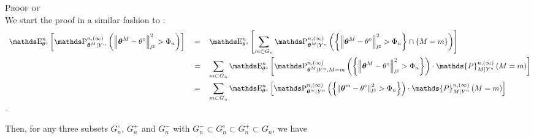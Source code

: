\begin{pro}{\textsc{Proof of } \\}\label{PRO_BAYES_STRATEGIES_EXPOLIM}
We start the proof in a similar fashion to :
\begin{alignat*}{3}
& \E_{\theta^{\circ}}^{n}\left[\P^{n, (\infty)}_{\boldsymbol{\theta}^{M} \vert Y^{n}}\left(\left\Vert  \boldsymbol{\theta}^{M} - \theta^{\circ}\right\Vert_{l^{2}}^{2} > \Phi_{n} \right)\right] && = && \E_{\theta^{\circ}}^{n}\left[\sum\limits_{m \subset G_{n}}\P^{n, (\infty)}_{\boldsymbol{\theta}^{M} \vert Y^{n}}\left(\left\{\left\Vert  \boldsymbol{\theta}^{M} - \theta^{\circ}\right\Vert_{l^{2}}^{2} > \Phi_{n}\right\} \cap \left\{ M = m \right\} \right)\right]\\
& && = && \sum\limits_{m \subset G_{n}}\E_{\theta^{\circ}}^{n}\left[\P^{n, (\infty)}_{\boldsymbol{\theta}^{M} \vert Y^{n}, M = m}\left(\left\{\left\Vert  \boldsymbol{\theta}^{M} - \theta^{\circ}\right\Vert_{l^{2}}^{2} > \Phi_{n}\right\}\right) \cdot \mathds{P}_{M \vert Y^{n}}^{n, (\infty)}\left(M = m\right)\right]\\
& && = && \sum\limits_{m \subset G_{n}}\E_{\theta^{\circ}}^{n}\left[\P^{n, (\infty)}_{\boldsymbol{\theta}^{m} \vert Y^{n}}\left(\left\{\left\Vert  \boldsymbol{\theta}^{m} - \theta^{\circ}\right\Vert_{l^{2}}^{2} > \Phi_{n}\right\}\right) \cdot \mathds{P}_{M \vert Y^{n}}^{n, (\infty)}\left(M = m\right)\right]\\.
\end{alignat*}

Then, for any three subsets $G^{\circ}_{n}$, $G^{+}_{n}$ and $G^{-}_{n}$ with $G^{-}_{n} \subset G^{\circ}_{n} \subset G^{+}_{n} \subset G_{n}$, we have


\end{pro}
